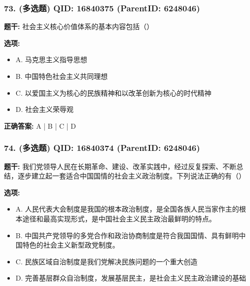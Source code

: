 \documentclass[12pt,UTF8]{ctexart}
\begin{document}
\subsubsection*{73. (多选题) \small QID: 16840375 (ParentID: 6248046)}

\textbf{题干:}
社会主义核心价值体系的基本内容包括（）



\textbf{选项:}
\begin{itemize}[leftmargin=*]

  \item A. 马克思主义指导思想

  \item B. 中国特色社会主义共同理想

  \item C. 以爱国主义为核心的民族精神和以改革创新为核心的时代精神

  \item D. 社会主义荣辱观

\end{itemize}

\textbf{正确答案:}
A | B | C | D

\vspace{0.3em}\hrulefill\vspace{0.7em}

\subsubsection*{74. (多选题) \small QID: 16840374 (ParentID: 6248046)}

\textbf{题干:}
我们党领导人民在长期革命、建设、改革实践中，经过反复探索、不断总结，逐步建立起一套适合中国国情的社会主义政治制度。下列说法正确的有（）



\textbf{选项:}
\begin{itemize}[leftmargin=*]

  \item A. 人民代表大会制度是我国的根本政治制度，是全国各族人民当家作主的根本途径和最高实现形式，是中国社会主义民主政治最鲜明的特点。

  \item B. 中国共产党领导的多党合作和政治协商制度是符合我国国情、具有鲜明中国特色的社会主义新型政党制度。

  \item C. 民族区域自治制度是我们党解决民族问题的一个重大创造

  \item D. 完善基层群众自治制度，发展基层民主，是社会主义民主政治建设的基础

\end{itemize}
\end{document}
